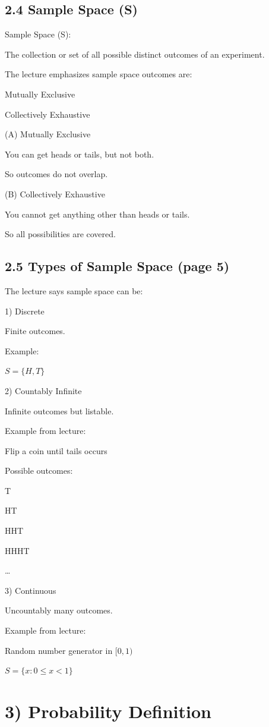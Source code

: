 \documentclass[12pt,a4paper]{article}
\begin{document}
\subsection*{2.4 Sample Space (S)}

Sample Space (S):

The collection or set of all possible distinct outcomes of an experiment.

The lecture emphasizes sample space outcomes are:

Mutually Exclusive

Collectively Exhaustive

(A) Mutually Exclusive

You can get heads or tails, but not both.

So outcomes do not overlap.

(B) Collectively Exhaustive

You cannot get anything other than heads or tails.

So all possibilities are covered.

\subsection*{2.5 Types of Sample Space (page 5)}

The lecture says sample space can be:

1) Discrete

Finite outcomes.

Example:

$S = \{H,T\}$

2) Countably Infinite

Infinite outcomes but listable.

Example from lecture:

Flip a coin until tails occurs

Possible outcomes:

T

HT

HHT

HHHT

…

3) Continuous

Uncountably many outcomes.

Example from lecture:

Random number generator in $[0,1)$

$S = \{x : 0 \le x < 1\}$

\section*{3) Probability Definition}
\end{document}
